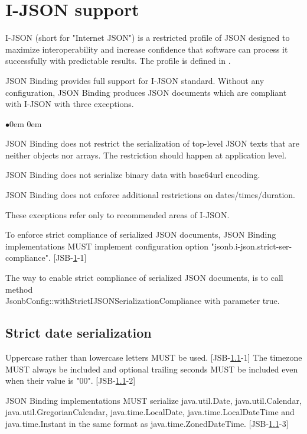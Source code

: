 \section{I-JSON support}
\label{sec:i_json}

I-JSON (short for "Internet JSON") is a restricted profile of JSON designed to maximize interoperability and increase confidence that software can process it successfully with predictable results. The profile is defined in \cite{rfc7159}.

JSON Binding provides full support for I-JSON standard. Without any configuration, JSON Binding produces JSON documents which are compliant with I-JSON with three exceptions.

\begin{list}{$\bullet$}{\parsep 0em  0em}
\item JSON Binding does not restrict the serialization of top-level JSON texts that are neither objects nor arrays. The restriction should happen at application level.
\item JSON Binding does not serialize binary data with base64url encoding.
\item JSON Binding does not enforce additional restrictions on dates/times/duration.
\end{list}

These exceptions refer only to recommended areas of I-JSON.

To enforce strict compliance of serialized JSON documents, JSON Binding implementations MUST implement configuration option "jsonb.i-json.strict-ser-compliance".
[JSB-\ref{sec:i_json}-1]

The way to enable strict compliance of serialized JSON documents, is to call method \\ JsonbConfig::withStrictIJSONSerializationCompliance with parameter true.

\subsection{Strict date serialization}
\label{subsec:strict_date_serialization}

Uppercase rather than lowercase letters MUST be used.  [JSB-\ref{subsec:strict_date_serialization}-1] The timezone MUST always be included and optional trailing seconds MUST be included even when their value is "00". [JSB-\ref{subsec:strict_date_serialization}-2]

JSON Binding implementations MUST serialize java.util.Date, java.util.Calendar, java.util.GregorianCalendar, java.time.LocalDate, java.time.LocalDateTime and java.time.Instant in the same format as java.time.ZonedDateTime. [JSB-\ref{subsec:strict_date_serialization}-3]

